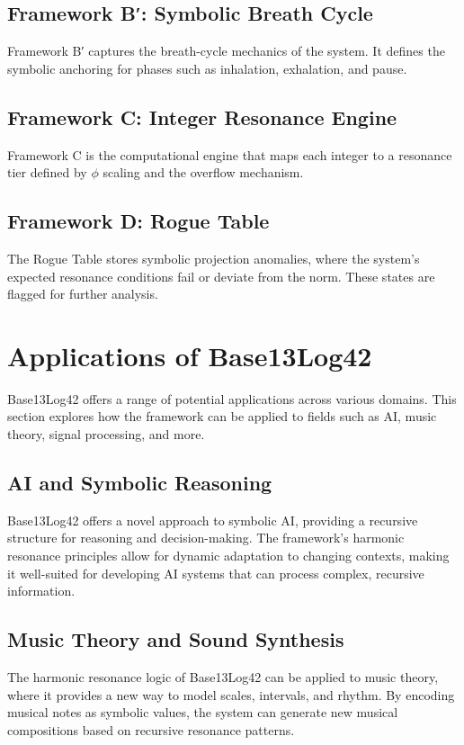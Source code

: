 \documentclass[12pt]{article}
\begin{document}
\subsection{Framework B′: Symbolic Breath Cycle}
Framework B′ captures the breath-cycle mechanics of the system. It defines the symbolic anchoring for phases such as inhalation, exhalation, and pause.

\subsection{Framework C: Integer Resonance Engine}
Framework C is the computational engine that maps each integer to a resonance tier defined by $\phi$ scaling and the overflow mechanism.

\subsection{Framework D: Rogue Table}
The Rogue Table stores symbolic projection anomalies, where the system's expected resonance conditions fail or deviate from the norm. These states are flagged for further analysis.

\section{Applications of Base13Log42}
Base13Log42 offers a range of potential applications across various domains. This section explores how the framework can be applied to fields such as AI, music theory, signal processing, and more.

\subsection{AI and Symbolic Reasoning}
Base13Log42 offers a novel approach to symbolic AI, providing a recursive structure for reasoning and decision-making. The framework's harmonic resonance principles allow for dynamic adaptation to changing contexts, making it well-suited for developing AI systems that can process complex, recursive information.

\subsection{Music Theory and Sound Synthesis}
The harmonic resonance logic of Base13Log42 can be applied to music theory, where it provides a new way to model scales, intervals, and rhythm. By encoding musical notes as symbolic values, the system can generate new musical compositions based on recursive resonance patterns.
\end{document}
